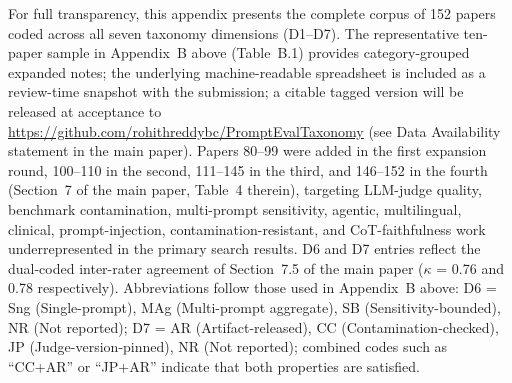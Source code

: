 \documentclass[acmsmall, nonacm, screen]{acmart}
\begin{document}
For full transparency, this appendix presents the complete corpus
of 152 papers coded across all seven taxonomy dimensions
(D1--D7). The representative ten-paper sample in
Appendix~B above (Table~B.1) provides
category-grouped expanded notes; the underlying machine-readable spreadsheet is included as a
review-time snapshot with the submission; a citable tagged version
will be released at acceptance to
\url{https://github.com/rohithreddybc/PromptEvalTaxonomy}
(see Data Availability statement in the main paper). Papers 80--99 were added in the first
expansion round, 100--110 in the second, 111--145 in the third, and
146--152 in the fourth
(Section~7 of the main paper, Table~4 therein),
targeting LLM-judge quality, benchmark contamination,
multi-prompt sensitivity, agentic, multilingual, clinical,
prompt-injection, contamination-resistant, and CoT-faithfulness work
underrepresented in the primary search results. D6 and D7 entries
reflect the dual-coded inter-rater agreement of
Section~7.5 of the main paper
($\kappa$ = 0.76 and 0.78 respectively). Abbreviations follow those
used in Appendix~B above: D6 = Sng (Single-prompt),
MAg (Multi-prompt aggregate), SB (Sensitivity-bounded), NR (Not
reported); D7 = AR (Artifact-released), CC (Contamination-checked),
JP (Judge-version-pinned), NR (Not reported); combined codes such
as ``CC+AR'' or ``JP+AR'' indicate that both properties are
satisfied.
\end{document}
